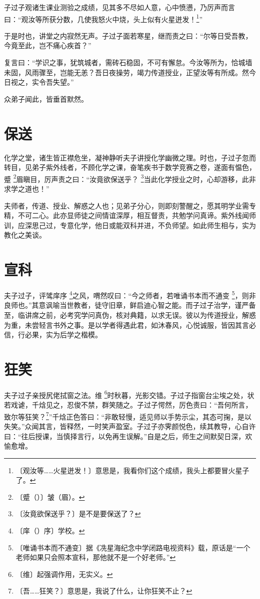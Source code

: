 \documentclass[b5paper,zihao=-4]{ctexbook}
\newcommand{\zhushi}[2]{#1 \footnote{〔#1〕#2}}
\newcommand{\zhushipy}[3]{#1 \footnote{〔#2〕#3}}
\begin{document}
子过子观诸生课业测验之成绩，见其多不尽如人意，心中愤懑，乃厉声而言曰：“观汝等所获分数，几使我怒火中烧，头上似有火星迸发！\footnote{〔观汝等……火星迸发！〕意思是，我看你们这个成绩，我头上都要冒火星子了。}”

于是时也，讲堂之内寂然无声。子过子面若寒星，继而责之曰：“尔等日受吾教，今竟至此，岂不痛心疾首？”

复言曰：“学识之事，犹筑城者，需砖石稳固，不可有懈怠。今汝等所为，恰城墙未固，风雨骤至，岂能无恙？吾日夜操劳，竭力传道授业，正望汝等有所成。然今日视之，实令吾失望。”

众弟子闻此，皆垂首默然。

\chapter{保送}

化学之堂，诸生皆正襟危坐，凝神静听夫子讲授化学幽微之理。时也，子过子忽而转目，见弟子紫外线者，不顾化学之课，奋笔疾书于数学竞赛之卷，遂面有愠色，\zhushipy{蹙}{蹙（）}{皱（眉）。}眉瞋目，厉声责之曰：“\zhushi{汝竟欲保送乎？}{是不是要保送了？}当此化学授业之时，心却游移，此非求学之道也！”

夫师者，传道、授业、解惑之人也；见弟子分心，则即刻警醒之，愿其明学业需专精，不可二心。此亦显师徒之间情谊深厚，相互督责，共勉学问真谛。紫外线闻师训，应深思己过，专意化学，他日或能双科并进，不负师望。如此师生相与，实为教化之美谈。
\chapter{宣科}

夫子过子，评骘\zhushipy{庠序}{庠（）序}{学校。}之风，喟然叹曰：“今之师者，若\zhushi{唯诵书本而不通变}{据《冼星海纪念中学闭路电视资料》载，原话是“一个老师如果只会照本宣科，那他就不是一个好老师。”}，则非良师也。”其意讽喻当世教者，徒守旧章，鲜启迪心智之能。而子过子治学，谨严备至，临讲席之前，必考究学问真伪，核对典籍，以求无误。彼以为传道授业，解惑为重，未尝轻言书外之事。是以学者得遇此君，如沐春风，心悦诚服，皆因其言必信，行必果，实为后学之楷模。

\chapter{狂笑}

夫子过子亲授尻佬拭窗之法。\zhushi{维}{起强调作用，无实义。}时秋暮，光影交错。子过子指窗台尘埃之处，状若戏谑，千焓见之，忍俊不禁，群笑随之。子过子愕然，厉色责曰：“吾何所言，致尔等狂笑？\footnote{〔吾……狂笑？〕意思是，我说了什么，让你狂笑不止？}”千焓正色答曰：“非敢轻慢，适见师以手势示尘，其态可掬，是以失笑。”众闻其言，皆释然，一时笑声盈室。子过子亦霁颜悦色，续其教导，心自许曰：“往后授课，当慎择言行，以免再生误解。”自是之后，师生之间默契日深，欢愉愈增。
\end{document}
